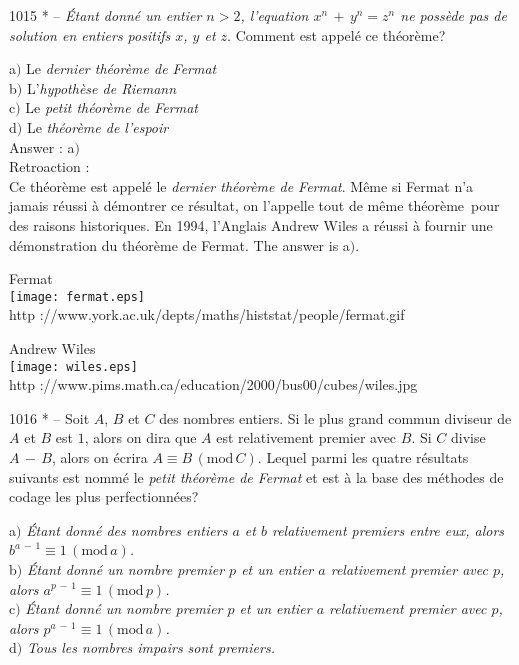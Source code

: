 ﻿\documentclass[letterpaper, 12pt]{article}
\begin{document}
1015 * -- {\sl \'Etant donn\'e un entier $n>2$, l'equation
$x^n\,+\,y^n=z^n$ ne poss\`ede pas de solution en entiers positifs
$x$, $y$ et $z$}. Comment est appel\'e ce th\'eor\`eme?

a$)$ Le {\sl dernier th\'eor\`eme de Fermat} \\
b$)$ L'{\sl hypoth\`ese de Riemann} \\
c$)$ Le {\sl petit th\'eor\`eme de Fermat} \\
d$)$ Le {\sl th\'eor\`eme de l'espoir}\\

Answer : a$)$\\

Retroaction : \\
Ce th\'eor\`eme est appel\'e le {\sl dernier th\'eor\`eme de
Fermat}. M\^eme si Fermat n'a jamais r\'eussi \`a d\'emontrer ce
r\'esultat, on l'appelle tout de m\^eme \og th\'eor\`eme\fg\ pour
des raisons historiques. En 1994, l'Anglais Andrew Wiles a r\'eussi
\`a fournir une d\'emonstration du th\'eor\`eme de Fermat.
The answer is a$)$.\\

        \begin{center}
        Fermat\\
    \texttt{[image: fermat.eps]}\\
        {\footnotesize http
://www.york.ac.uk/depts/maths/histstat/people/fermat.gif}
    \end{center}

        \begin{center}
        Andrew Wiles\\
    \texttt{[image: wiles.eps]}\\
        {\footnotesize http
://www.pims.math.ca/education/2000/bus00/cubes/wiles.jpg}
    \end{center}

1016 * -- Soit $A$, $B$ et $C$ des nombres entiers. Si le plus grand
commun diviseur de $A$ et $B$ est $1$, alors on dira que $A$ est
relativement premier avec $B$. Si $C$ divise $A\,-\,B$, alors on
\'ecrira $A\equiv B\,(\mathrm{mod}\,C)$. Lequel parmi les quatre
r\'esultats suivants est nomm\'e le {\sl petit th\'eor\`eme de
Fermat} et est \`a la base des m\'ethodes de codage les plus
perfectionn\'ees?

a$)$ {\sl \'Etant donn\'e des nombres entiers $a$ et $b$ relativement
premiers entre eux, alors $b^{a\,-\,1}\equiv1\,(\mathrm{mod}\,a)$.} \\
b$)$ {\sl \'Etant donn\'e un nombre premier $p$ et un entier $a$
relativement premier avec $p$, alors
$a^{p\,-\,1}\equiv1\,(\mathrm{mod}\,p)$.} \\
c$)$ {\sl \'Etant donn\'e un nombre premier $p$ et un entier $a$
relativement premier avec $p$, alors
$p^{a\,-\,1}\equiv1\,(\mathrm{mod}\,a)$.} \\
d$)$ {\sl Tous les nombres impairs sont premiers.}\\
\end{document}
